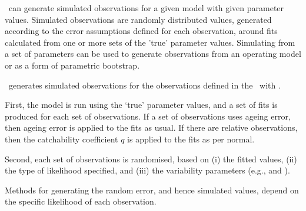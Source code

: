 \SPM\ can generate simulated observations for a given model with given parameter values. Simulated observations are randomly distributed values, generated according to the error assumptions defined for each observation, around fits calculated from one or more sets of the 'true' parameter values. Simulating from a set of parameters can be used to generate observations from an operating model or as a form of parametric bootstrap. 

\SPM\ generates simulated observations for the observations defined in the \config\ with . 

First, the model is run using the `true' parameter values, and a set of fits is produced for each set of observations. If a set of observations uses ageing error, then ageing error is applied to the fits as usual. If there are relative observations, then the catchability coefficient $q$ is applied to the fits as per normal. 

Second, each set of observations is randomised, based on (i) the fitted values, (ii) the type of likelihood specified, and (iii) the variability parameters (e.g.,  and ). 

Methods for generating the random error, and hence simulated values, depend on the specific likelihood of each observation. 

